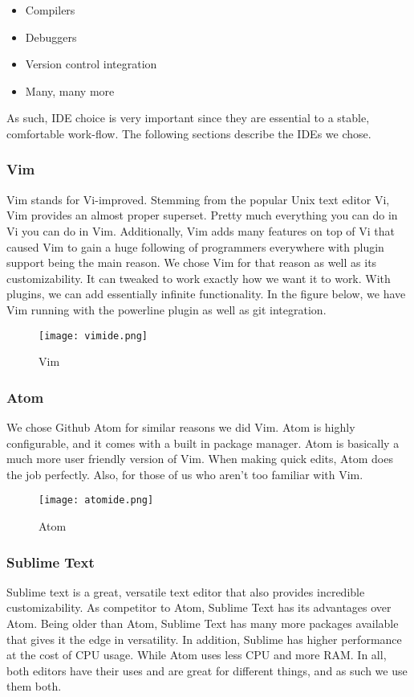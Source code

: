 \documentclass[letterpaper, 12pt]{article}
\begin{document}
\begin{itemize}
	\item Compilers
	\item Debuggers
	\item Version control integration
	\item Many, many more
\end{itemize}

As such, IDE choice is very important since they are essential to a stable, comfortable work-flow. The following sections describe the IDEs we chose.

\subsubsection{Vim}

Vim stands for Vi-improved. Stemming from the popular Unix text editor Vi, Vim 
provides an almost proper superset. Pretty much everything you can do in Vi you 
can do in Vim. Additionally, Vim adds many features on top of Vi that caused Vim 
to gain a huge following of programmers everywhere with plugin support being the main 
reason. We chose Vim for that reason as well as its customizability. It can tweaked 
to work exactly how we want it to work. With plugins, we can add essentially infinite 
functionality. In the figure below, we have Vim running with the powerline plugin as 
well as git integration. 

\begin{figure}
    \centering
	\texttt{[image: vimide.png]}
    \caption{Vim}
\end{figure}

\newpage

\subsubsection{Atom}
We chose Github Atom for similar reasons we did Vim. Atom is highly configurable, and it comes with a built in package manager. Atom is basically a much more user friendly version of Vim. When making quick edits, Atom does the job perfectly. Also, for those of us who aren't too familiar with Vim. 
\begin{figure}
    \centering
	\texttt{[image: atomide.png]}
    \caption{Atom}
\end{figure}

\newpage

\subsubsection{Sublime Text}
Sublime text is a great, versatile text editor that also provides incredible customizability. As competitor to Atom, Sublime Text has its advantages over Atom. Being older than Atom, Sublime Text has many more packages available that gives it the edge in versatility. In addition, Sublime has higher performance at the cost of CPU usage. While Atom uses less CPU and more RAM. In all, both editors have their uses and are great for different things, and as such we use them both. 
\end{document}

